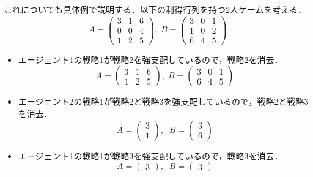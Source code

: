 \documentclass{jsreport}
\begin{document}
これについても具体例で説明する．以下の利得行列を持つ2人ゲームを考える．
\begin{equation}
  A = \left(
  \begin{array}{ccc}
    3 & 1 & 6 \\
    0 & 0 & 4 \\
    1 & 2 & 5
  \end{array}
  \right), \; B = \left(
  \begin{array}{ccc}
    3 & 0 & 1 \\
    1 & 0 & 2 \\
    6 & 4 & 5
  \end{array}
  \right) \nonumber
\end{equation}
\begin{itemize}
  \item エージェント1の戦略1が戦略2を強支配しているので，戦略2を消去．
  \begin{equation}
    A = \left(
    \begin{array}{ccc}
      3 & 1 & 6 \\
      1 & 2 & 5
    \end{array}
    \right), \; B = \left(
    \begin{array}{ccc}
      3 & 0 & 1 \\
      6 & 4 & 5
    \end{array}
    \right) \nonumber
  \end{equation}
  \item エージェント2の戦略1が戦略2と戦略3を強支配しているので，戦略2と戦略3を消去．
  \begin{equation}
    A = \left(
    \begin{array}{c}
      3 \\
      1
    \end{array}
    \right), \; \;
    B = \left(
    \begin{array}{c}
      3 \\
      6
    \end{array}
    \right) \nonumber
  \end{equation}
  \item エージェント1の戦略1が戦略3を強支配しているので，戦略3を消去．
  \begin{equation}
    A = \left(
    \begin{array}{c}
      3
    \end{array}
    \right), \; \;
    B = \left(
    \begin{array}{c}
      3
    \end{array}
    \right)\nonumber
  \end{equation}
\end{itemize}
\end{document}
